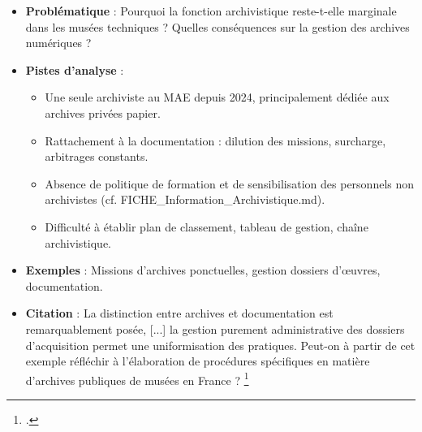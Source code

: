 \begin{itemize}
	\item \textbf{Problématique} : Pourquoi la fonction archivistique reste-t-elle marginale dans les musées techniques ? Quelles conséquences sur la gestion des archives numériques ?
	\item \textbf{Pistes d’analyse} :
	\begin{itemize}
		\item Une seule archiviste au MAE depuis 2024, principalement dédiée aux archives privées papier.
		\item Rattachement à la documentation : dilution des missions, surcharge, arbitrages constants.
		\item Absence de politique de formation et de sensibilisation des personnels non archivistes (cf. FICHE\_Information\_Archivistique.md).
		\item Difficulté à établir plan de classement, tableau de gestion, chaîne archivistique.
	\end{itemize}
	\item \textbf{Exemples} : Missions d’archives ponctuelles, gestion dossiers d’œuvres, documentation.
	\item \textbf{Citation} : \og La distinction entre archives et documentation est remarquablement posée, [...] la gestion purement administrative des dossiers d’acquisition permet une uniformisation des pratiques. Peut-on à partir de cet exemple réfléchir à l’élaboration de procédures spécifiques en matière d’archives publiques de musées en France ? \fg \footcite{sassetti-aguileraArchivesMuseesDiversites2020a}
\end{itemize}

